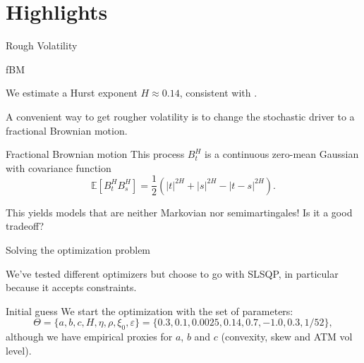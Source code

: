 \section{Highlights}

\begin{frame}{Rough Volatility}
    
\end{frame}

\begin{frame}{fBM}

    We estimate a Hurst exponent $H \approx 0.14$, consistent with \cite{gatheral2022volatility}.

    A convenient way to get rougher volatility is to change the stochastic driver to a fractional Brownian motion. 
    \begin{block}{Fractional Brownian motion}
    This process $B_t^H$ is a continuous zero-mean Gaussian with covariance function
    \[
    \mathbb{E}[B_t^H B_s^H] = \dfrac{1}{2} \left( \lvert t \rvert ^{2H} + \lvert s \rvert ^{2H} - \lvert t-s \rvert ^{2H}  \right).
    \]
    \end{block}

    This yields models that are neither Markovian nor semimartingales! Is it a good tradeoff?
\end{frame}

\begin{frame}{Solving the optimization problem}

    We've tested different optimizers but choose to go with SLSQP, in particular because it accepts constraints.
    
    \begin{exampleblock}{Initial guess}
        We start the optimization with the set of parameters: \[\Theta = \{a,b,c,H,\eta,\rho,\xi_0,\varepsilon \} = \{0.3, 0.1, 0.0025, 0.14, 0.7, -1.0, 0.3, 1/52\},\]
        although we have empirical proxies for $a$, $b$ and $c$ (convexity, skew and ATM vol level).
    \end{exampleblock}
\end{frame}
